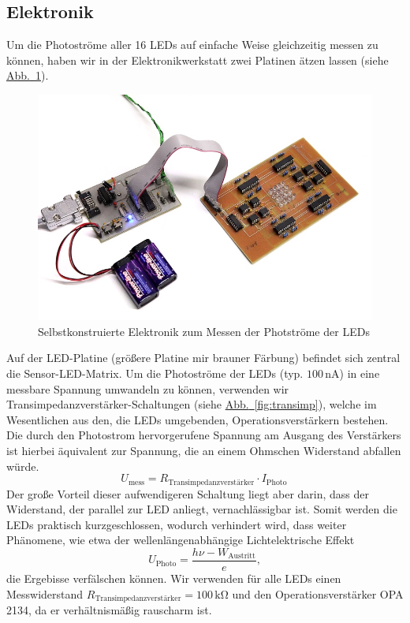 \documentclass[11pt]{scrartcl}
\newcommand{\unit}[1]{\ensuremath{\,\mathrm{#1}}} %
\newcommand{\hypref}[2]{\hyperref[#2]{{#1}~\ref{#2}}}
\begin{document}
\subsection{Elektronik}

Um die Photoströme aller 16 LEDs auf einfache Weise gleichzeitig messen zu können, haben wir in der Elektronikwerkstatt zwei Platinen ätzen lassen (siehe \hypref{Abb.}{fig:electronics}).

\begin{figure}[ht]
\begin{center}
\includegraphics[width=1.\textwidth]{platinen.jpg}
\end{center}
\vspace{-1.5\baselineskip}
\caption{Selbstkonstruierte Elektronik zum Messen der Photströme der LEDs}
\label{fig:electronics}
\end{figure}

Auf der LED-Platine (größere Platine mir brauner Färbung) befindet sich zentral die Sensor-LED-Matrix.
Um die Photoströme der LEDs (typ. $100 \unit{nA}$) in eine messbare Spannung umwandeln zu können, verwenden wir Transimpedanzverstärker-Schaltungen (siehe \hypref{Abb.}{fig:transimp}), welche im Wesentlichen aus den, die LEDs umgebenden, Operationsverstärkern bestehen.
Die durch den Photostrom hervorgerufene Spannung am Ausgang des Verstärkers ist hierbei äquivalent zur Spannung, die an einem Ohmschen Widerstand abfallen würde.
\begin{equation*}
U_{\text{mess}} = R_{\text{Transimpedanzverstärker}} \cdot I_{\text{Photo}}\,
\end{equation*}
Der große Vorteil dieser aufwendigeren Schaltung liegt aber darin, dass der Widerstand, der parallel zur LED anliegt, vernachlässigbar ist. Somit werden die LEDs praktisch kurzgeschlossen, wodurch verhindert wird, dass weiter Phänomene, wie etwa der wellenlängenabhängige Lichtelektrische Effekt
\begin{equation*}
U_{\text{Photo}} = \frac {h \nu - W_{\text{Austritt}}} {e},
\end{equation*}
die Ergebisse verfälschen können. Wir verwenden für alle LEDs einen Messwiderstand $R_{\text{Transimpedanzverstärker}} = 100 \unit{k \Omega}$ und den Operationsverstärker OPA 2134, da er verhältnismäßig rauscharm ist. 
\end{document}
